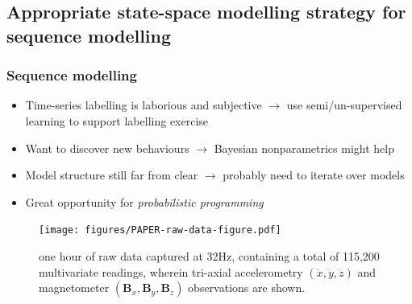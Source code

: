 \documentclass[aspectratio=169]{beamer}
\begin{document}

\begin{frame}
    \subsection{Appropriate state-space modelling strategy for sequence modelling}

    \frametitle{Sequence modelling}
    \begin{itemize}
        \item Time-series labelling is laborious and subjective $\rightarrow$ use semi/un-supervised learning to support labelling exercise
        \item Want to discover new behaviours $\rightarrow$ Bayesian nonparametrics might help 
        \item Model structure still far from clear $\rightarrow$ probably need to iterate over models 
        \item Great opportunity for \emph{probabilistic programming}
    \end{itemize}
    \vspace{-1em}
    \begin{figure}
        \centering
        \texttt{[image: figures/PAPER-raw-data-figure.pdf]}
        \vspace{-0.5em}
        \caption{one hour of raw data captured at 32Hz, containing a total of 115,200 multivariate readings, wherein tri-axial accelerometry $(\ddot{x},\ddot{y},\ddot{z})$ and magnetometer $(\mathbf{B}_x,\mathbf{B}_y,\mathbf{B}_z)$ observations are shown.}
    \end{figure}


\end{frame}


\end{document}

